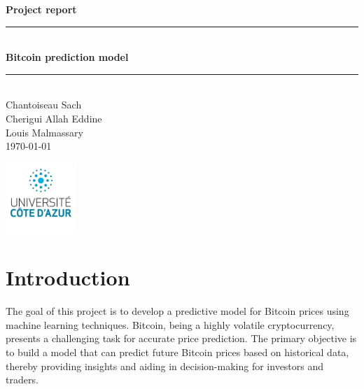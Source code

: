 \documentclass{article}
\begin{document}
\begin{titlepage}
    \vspace*{\fill}
    \begin{center}
        \Large \textbf{Project report} \\
        \vspace{0.5cm}
        \rule{\textwidth}{1pt} \\
        \vspace{0.5cm}
        \Huge \textbf{Bitcoin prediction model} \\
        \vspace{0.5cm}
        \rule{\textwidth}{1pt} \\
        \vspace{1cm}
        \Large Chantoiseau Sach\\Cherigui Allah Eddine\\Louis Malmassary\\
        \vspace{1cm}
        \normalsize \today
    \end{center}
    \vspace*{\fill}
    \begin{flushleft}
        \includegraphics[width=0.2\textwidth]{img/UCA.png}
    \end{flushleft}
\end{titlepage}

\newpage

\tableofcontents

\newpage

\section{Introduction}
The goal of this project is to develop a predictive model for Bitcoin prices using machine learning techniques. Bitcoin, being a highly volatile cryptocurrency, presents a challenging task for accurate price prediction. The primary objective is to build a model that can predict future Bitcoin prices based on historical data, thereby providing insights and aiding in decision-making for investors and traders.
\end{document}
